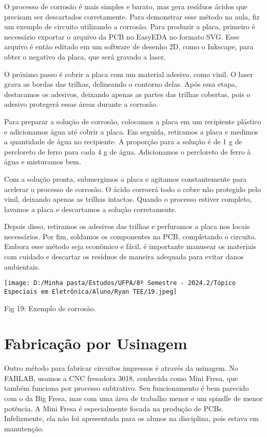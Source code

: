 \documentclass[
]{book}
\begin{document}
O processo de corrosão é mais simples e barato, mas gera resíduos ácidos que precisam ser descartados corretamente. Para demonstrar esse método na aula, fiz um exemplo de circuito utilizando a corrosão. Para produzir a placa, primeiro é necessário exportar o arquivo da PCB no EasyEDA no formato SVG. Esse arquivo é então editado em um software de desenho 2D, como o Inkscape, para obter o negativo da placa, que será gravado a laser.

O próximo passo é cobrir a placa com um material adesivo, como vinil. O laser grava as bordas das trilhas, delineando o contorno delas. Após essa etapa, destacamos os adesivos, deixando apenas as partes das trilhas cobertas, pois o adesivo protegerá essas áreas durante a corrosão.

Para preparar a solução de corrosão, colocamos a placa em um recipiente plástico e adicionamos água até cobrir a placa. Em seguida, retiramos a placa e medimos a quantidade de água no recipiente. A proporção para a solução é de 1 g de percloreto de ferro para cada 4 g de água. Adicionamos o percloreto de ferro à água e misturamos bem.

Com a solução pronta, submergimos a placa e agitamos constantemente para acelerar o processo de corrosão. O ácido corroerá todo o cobre não protegido pelo vinil, deixando apenas as trilhas intactas. Quando o processo estiver completo, lavamos a placa e descartamos a solução corretamente.

Depois disso, retiramos os adesivos das trilhas e perfuramos a placa nos locais necessários. Por fim, soldamos os componentes na PCB, completando o circuito. Embora esse método seja econômico e fácil, é importante manusear os materiais com cuidado e descartar os resíduos de maneira adequada para evitar danos ambientais.

\texttt{[image: D:/Minha pasta/Estudos/UFPA/8º Semestre - 2024.2/Tópico Especiais em Eletrônica/Aluno/Ryan TEE/19.jpeg]}

Fig 19: Exemplo de corrosão.

\section{Fabricação por Usinagem}\label{fabricauxe7uxe3o-por-usinagem}

Outro método para fabricar circuitos impressos é através da usinagem. No FABLAB, usamos a CNC fresadora 3018, conhecida como Mini Fresa, que também funciona por processo subtrativo. Seu funcionamento é bem parecido com o da Big Fresa, mas com uma área de trabalho menor e um spindle de menor potência. A Mini Fresa é especialmente focada na produção de PCBs. Infelizmente, ela não foi apresentada para os alunos na disciplina, pois estava em manutenção.
\end{document}
